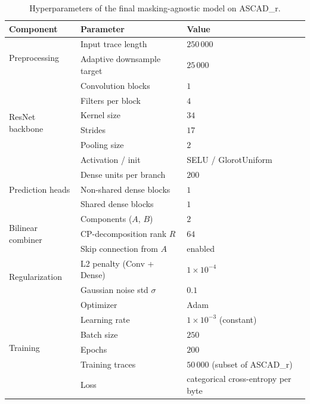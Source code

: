 \documentclass[runningheads]{llncs}
\begin{document}
\begin{table}[t]
  \centering
  \caption{Hyperparameters of the final masking-agnostic model on ASCAD\_r.}
  \label{tab:hyperparams}
  \small
  \begin{tabular}{@{}lll@{}}
    \toprule
    \textbf{Component} & \textbf{Parameter} & \textbf{Value} \\
    \midrule
    \multirow{2}{*}{Preprocessing}
      & Input trace length & $250\,000$ \\
      & Adaptive downsample target & $25\,000$ \\
    \midrule
    \multirow{6}{*}{ResNet backbone}
      & Convolution blocks & $1$ \\
      & Filters per block  & $4$ \\
      & Kernel size        & $34$ \\
      & Strides            & $17$ \\
      & Pooling size       & $2$ \\
      & Activation / init  & SELU / GlorotUniform \\
    \midrule
    \multirow{3}{*}{Prediction heads}
      & Dense units per branch  & $200$ \\
      & Non-shared dense blocks & $1$ \\
      & Shared dense blocks     & $1$ \\
    \midrule
    \multirow{3}{*}{Bilinear combiner}
      & Components ($A$, $B$)   & $2$ \\
      & CP-decomposition rank $R$ & $64$ \\
      & Skip connection from $A$  & enabled \\
    \midrule
    \multirow{2}{*}{Regularization}
      & L2 penalty (Conv + Dense) & $1\times 10^{-4}$ \\
      & Gaussian noise std $\sigma$ & $0.1$ \\
    \midrule
    \multirow{6}{*}{Training}
      & Optimizer          & Adam \\
      & Learning rate      & $1\times 10^{-3}$ (constant) \\
      & Batch size         & $250$ \\
      & Epochs             & $200$ \\
      & Training traces    & $50\,000$ (subset of ASCAD\_r) \\
      & Loss               & categorical cross-entropy per byte \\
    \bottomrule
  \end{tabular}
\end{table}
\end{document}
